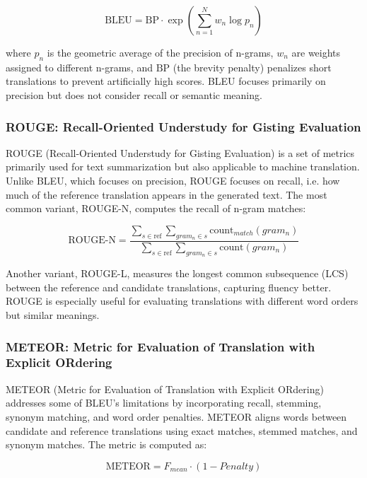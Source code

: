 \begin{equation}
\text{BLEU} = \text{BP} \cdot \exp\left(\sum_{n=1}^{N} w_n \log p_n \right)
\end{equation}

where  $p_n$ is the geometric average of the precision of n-grams,  $w_n$ are weights assigned to different n-grams, and  $\text{BP}$ (the brevity penalty) 
penalizes short translations to prevent artificially high scores. BLEU focuses primarily on precision but does not consider recall or semantic meaning.

\subsubsection{ROUGE: Recall-Oriented Understudy for Gisting Evaluation}
ROUGE (Recall-Oriented Understudy for Gisting Evaluation) \cite{linROUGEPackageAutomatic2004} is a set of metrics primarily used for text summarization but 
also applicable to machine translation. Unlike BLEU, which focuses on precision, ROUGE focuses on recall, i.e. how much of the reference translation appears in the generated text. 
The most common variant, ROUGE-N, computes the recall of n-gram matches:

\begin{equation}
\text{ROUGE-N} = \frac{\sum_{s \in \text{ref}} \sum_{gram_n \in s} \text{count}_{match}(gram_n)}{\sum_{s \in \text{ref}} \sum_{gram_n \in s} \text{count}(gram_n)}
\end{equation}

Another variant, ROUGE-L, measures the longest common subsequence (LCS) between the reference and candidate translations, capturing 
fluency better. ROUGE is especially useful for evaluating translations with different word orders but similar meanings.

\subsubsection{METEOR: Metric for Evaluation of Translation with Explicit ORdering}
METEOR (Metric for Evaluation of Translation with Explicit ORdering) addresses some of BLEU's limitations by incorporating recall, stemming, synonym matching, and word order penalties. 
METEOR aligns words between candidate and reference translations using exact matches, stemmed matches, and synonym matches. The metric is computed as:

\begin{equation}
\text{METEOR} = F_{mean} \cdot (1 - Penalty)
\end{equation}

